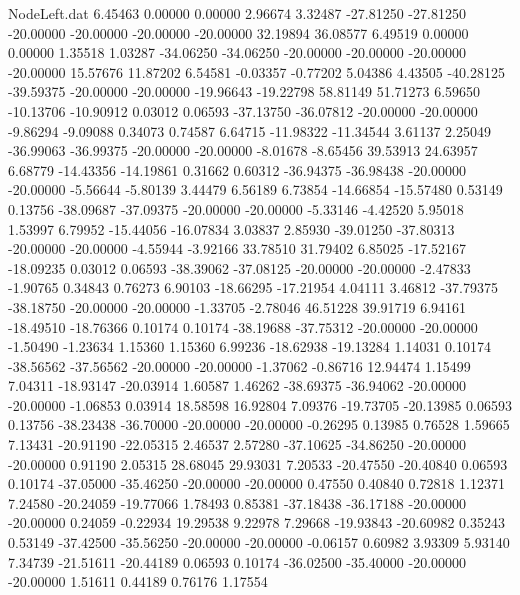 \begin{filecontents}{NodeLeft.dat}
   6.45463    0.00000    0.00000     2.96674    3.32487  -27.81250  -27.81250  -20.00000  -20.00000  -20.00000  -20.00000   32.19894   36.08577
   6.49519    0.00000    0.00000     1.35518    1.03287  -34.06250  -34.06250  -20.00000  -20.00000  -20.00000  -20.00000   15.57676   11.87202
   6.54581   -0.03357   -0.77202     5.04386    4.43505  -40.28125  -39.59375  -20.00000  -20.00000  -19.96643  -19.22798   58.81149   51.71273
   6.59650  -10.13706  -10.90912     0.03012    0.06593  -37.13750  -36.07812  -20.00000  -20.00000   -9.86294   -9.09088    0.34073    0.74587
   6.64715  -11.98322  -11.34544     3.61137    2.25049  -36.99063  -36.99375  -20.00000  -20.00000   -8.01678   -8.65456   39.53913   24.63957
   6.68779  -14.43356  -14.19861     0.31662    0.60312  -36.94375  -36.98438  -20.00000  -20.00000   -5.56644   -5.80139    3.44479    6.56189
   6.73854  -14.66854  -15.57480     0.53149    0.13756  -38.09687  -37.09375  -20.00000  -20.00000   -5.33146   -4.42520    5.95018    1.53997
   6.79952  -15.44056  -16.07834     3.03837    2.85930  -39.01250  -37.80313  -20.00000  -20.00000   -4.55944   -3.92166   33.78510   31.79402
   6.85025  -17.52167  -18.09235     0.03012    0.06593  -38.39062  -37.08125  -20.00000  -20.00000   -2.47833   -1.90765    0.34843    0.76273
   6.90103  -18.66295  -17.21954     4.04111    3.46812  -37.79375  -38.18750  -20.00000  -20.00000   -1.33705   -2.78046   46.51228   39.91719
   6.94161  -18.49510  -18.76366     0.10174    0.10174  -38.19688  -37.75312  -20.00000  -20.00000   -1.50490   -1.23634    1.15360    1.15360
   6.99236  -18.62938  -19.13284     1.14031    0.10174  -38.56562  -37.56562  -20.00000  -20.00000   -1.37062   -0.86716   12.94474    1.15499
   7.04311  -18.93147  -20.03914     1.60587    1.46262  -38.69375  -36.94062  -20.00000  -20.00000   -1.06853    0.03914   18.58598   16.92804
   7.09376  -19.73705  -20.13985     0.06593    0.13756  -38.23438  -36.70000  -20.00000  -20.00000   -0.26295    0.13985    0.76528    1.59665
   7.13431  -20.91190  -22.05315     2.46537    2.57280  -37.10625  -34.86250  -20.00000  -20.00000    0.91190    2.05315   28.68045   29.93031
   7.20533  -20.47550  -20.40840     0.06593    0.10174  -37.05000  -35.46250  -20.00000  -20.00000    0.47550    0.40840    0.72818    1.12371
   7.24580  -20.24059  -19.77066     1.78493    0.85381  -37.18438  -36.17188  -20.00000  -20.00000    0.24059   -0.22934   19.29538    9.22978
   7.29668  -19.93843  -20.60982     0.35243    0.53149  -37.42500  -35.56250  -20.00000  -20.00000   -0.06157    0.60982    3.93309    5.93140
   7.34739  -21.51611  -20.44189     0.06593    0.10174  -36.02500  -35.40000  -20.00000  -20.00000    1.51611    0.44189    0.76176    1.17554

\end{filecontents}

